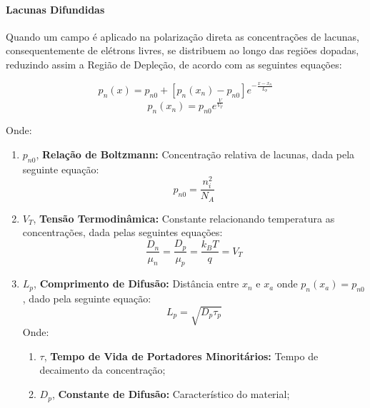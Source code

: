 \documentclass{article}
\begin{document}
            \paragraph{Lacunas Difundidas}Quando um campo é aplicado na polarização direta as concentrações de lacunas, consequentemente de elétrons livres, se distribuem ao longo das regiões dopadas, reduzindo assim a Região de Depleção, de acordo com as seguintes equações: 
                \begin{multicols}{2}
                    \begin{equation}
                        \boxed{
                            p_{n}(x) = p_{n0} + [p_{n}(x_{n}) - p_{n0}]e^{- \frac{x - x_{n}}{L_{p}}}
                        }
                    \end{equation}
                    \begin{equation}
                        \boxed{
                            p_{n}(x_{n}) = p_{n0} e^{\frac{V}{V_{T}}}
                        }
                    \end{equation}
                \end{multicols}\noindent
            Onde:
                \begin{enumerate}[noitemsep]
                    \item $p_{n0}$, \textbf{Relação de Boltzmann:} Concentração relativa de lacunas, dada pela seguinte equação:
                        \[
                            \boxed{
                                p_{n0} = \frac{n_{i}^{2}}{N_{A}}
                                }
                        \]
                    \item $V_{T}$, \textbf{Tensão Termodinâmica:} Constante relacionando temperatura as concentrações, dada pelas seguintes equações:
                        \[
                            \boxed{
                            \frac{D_{n}}{\mu_{n}} = \frac{D_{p}}{\mu_{p}} = \frac{k_{B} T}{q} = V_{T}
                            }
                        \]
                    \item $L_{p}$, \textbf{Comprimento de Difusão:} Distância entre $x_{n}$ e $x_{a}$ onde $p_{n}(x_{a}) = p_{n0}$, dado pela seguinte equação:
                        \[
                            \boxed{
                                L_{p} = \sqrt{D_{p} \tau_{p}}
                            }
                        \]
                    Onde:
                        \begin{enumerate}[noitemsep]
                            \item $\tau$, \textbf{Tempo de Vida de Portadores Minoritários:} Tempo de decaimento da concentração;
                            \item $D_{p}$, \textbf{Constante de Difusão:} Característico do material; 
                        \end{enumerate}
                \end{enumerate}
\end{document}
